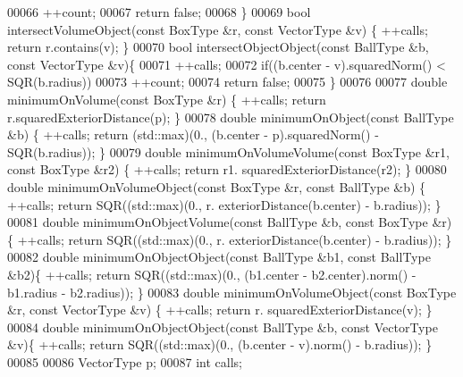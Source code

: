 \begin{DoxyCode}
00066       ++count;
00067     \textcolor{keywordflow}{return} \textcolor{keyword}{false};
00068   \}
00069   \textcolor{keywordtype}{bool} intersectVolumeObject(\textcolor{keyword}{const} BoxType &r, \textcolor{keyword}{const} VectorType &v) \{ ++calls; \textcolor{keywordflow}{return} r.contains(v); \}
00070   \textcolor{keywordtype}{bool} intersectObjectObject(\textcolor{keyword}{const} BallType &b, \textcolor{keyword}{const} VectorType &v)\{
00071     ++calls;
00072     \textcolor{keywordflow}{if}((b.center - v).squaredNorm() < SQR(b.radius))
00073       ++count;
00074     \textcolor{keywordflow}{return} \textcolor{keyword}{false};
00075   \}
00076 
00077   \textcolor{keywordtype}{double} minimumOnVolume(\textcolor{keyword}{const} BoxType &r) \{ ++calls; \textcolor{keywordflow}{return} r.squaredExteriorDistance(p); \}
00078   \textcolor{keywordtype}{double} minimumOnObject(\textcolor{keyword}{const} BallType &b) \{ ++calls; \textcolor{keywordflow}{return} (std::max)(0., (b.center - p).squaredNorm() -
       SQR(b.radius)); \}
00079   \textcolor{keywordtype}{double} minimumOnVolumeVolume(\textcolor{keyword}{const} BoxType &r1, \textcolor{keyword}{const} BoxType &r2) \{ ++calls; \textcolor{keywordflow}{return} r1.
      squaredExteriorDistance(r2); \}
00080   \textcolor{keywordtype}{double} minimumOnVolumeObject(\textcolor{keyword}{const} BoxType &r, \textcolor{keyword}{const} BallType &b) \{ ++calls; \textcolor{keywordflow}{return} SQR((std::max)(0., r.
      exteriorDistance(b.center) - b.radius)); \}
00081   \textcolor{keywordtype}{double} minimumOnObjectVolume(\textcolor{keyword}{const} BallType &b, \textcolor{keyword}{const} BoxType &r) \{ ++calls; \textcolor{keywordflow}{return} SQR((std::max)(0., r.
      exteriorDistance(b.center) - b.radius)); \}
00082   \textcolor{keywordtype}{double} minimumOnObjectObject(\textcolor{keyword}{const} BallType &b1, \textcolor{keyword}{const} BallType &b2)\{ ++calls; \textcolor{keywordflow}{return} SQR((std::max)(0., 
      (b1.center - b2.center).norm() - b1.radius - b2.radius)); \}
00083   \textcolor{keywordtype}{double} minimumOnVolumeObject(\textcolor{keyword}{const} BoxType &r, \textcolor{keyword}{const} VectorType &v) \{ ++calls; \textcolor{keywordflow}{return} r.
      squaredExteriorDistance(v); \}
00084   \textcolor{keywordtype}{double} minimumOnObjectObject(\textcolor{keyword}{const} BallType &b, \textcolor{keyword}{const} VectorType &v)\{ ++calls; \textcolor{keywordflow}{return} SQR((std::max)(0., 
      (b.center - v).norm() - b.radius)); \}
00085 
00086   VectorType p;
00087   \textcolor{keywordtype}{int} calls;

\end{DoxyCode}
